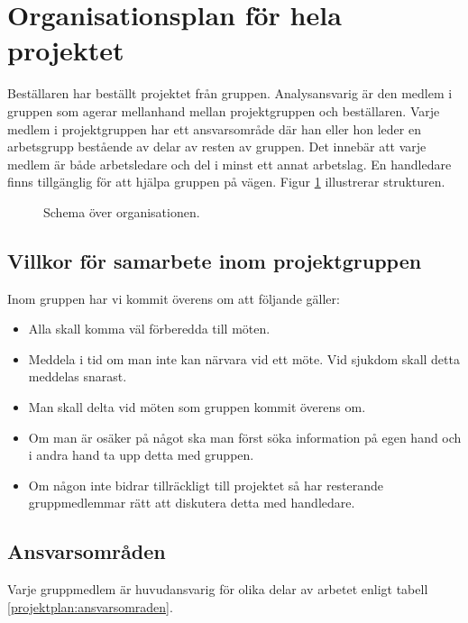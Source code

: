 \section{Organisationsplan för hela projektet}
Beställaren har beställt projektet från gruppen. Analysansvarig är den medlem i gruppen som agerar mellanhand mellan projektgruppen och beställaren. Varje medlem i projektgruppen har ett ansvarsområde där han eller hon leder en arbetsgrupp bestående av delar av resten av gruppen. Det innebär att varje medlem är både arbetsledare och del i minst ett annat arbetslag. En handledare finns tillgänglig för att hjälpa gruppen på vägen. Figur \ref{projektplan:organisationsplan} illustrerar strukturen.

\begin{figure}[H]
\center
{}%

%
\caption{Schema över organisationen.} \label{projektplan:organisationsplan}
\endcenter
\end{figure}

\subsection{Villkor för samarbete inom projektgruppen}
Inom gruppen har vi kommit överens om att följande gäller:
\begin{itemize}
\item{Alla skall komma väl förberedda till möten.}
\item{Meddela i tid om man inte kan närvara vid ett möte. Vid sjukdom skall detta meddelas snarast.}
\item{Man skall delta vid möten som gruppen kommit överens om.}
\item{Om man är osäker på något ska man först söka information på egen hand och i andra hand ta upp detta med gruppen.}
\item{Om någon inte bidrar tillräckligt till projektet så har resterande gruppmedlemmar rätt att diskutera detta med handledare.}
\end{itemize}

\newpage
\subsection{Ansvarsområden}
Varje gruppmedlem är huvudansvarig för olika delar av arbetet enligt tabell \ref{projektplan:ansvarsomraden}.

